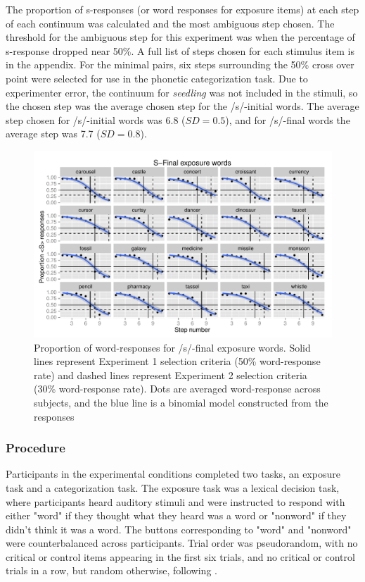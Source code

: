 The proportion of s-responses (or word responses for exposure items) at each step of each continuum was calculated and the most ambiguous step chosen. 
The threshold for the ambiguous step for this experiment was when the percentage of s-response dropped near 50\%. 
A full list of steps chosen for each stimulus item is in the appendix.  For the minimal pairs, six steps surrounding the 50\% cross over point were selected for use in the phonetic categorization task.  
Due to experimenter error, the continuum for \emph{seedling} was not included in the stimuli, so the chosen step was the average chosen step for the /s/-initial words.  
The average step chosen for /s/-initial words was 6.8 ($SD = 0.5$), and for /s/-final words the average step was 7.7 ($SD = 0.8$).

\begin{figure}
\includegraphics[width=\textwidth]{sfinalpretest.pdf}
\caption{Proportion of word-responses for /s/-final exposure words. Solid lines represent Experiment 1 selection criteria (50\% word-response rate) and dashed lines represent Experiment 2 selection criteria (30\% word-response rate).  Dots are averaged word-response across subjects, and the blue line is a binomial model constructed from the responses}
\end{figure}

\subsubsection{Procedure}

Participants in the experimental conditions completed two tasks, an exposure task and a categorization task.  
The exposure task was a lexical decision task, where participants heard auditory stimuli and were instructed to respond with either "word" if they thought what they heard was a word or "nonword" if they didn't think it was a word.  
The buttons corresponding to "word" and "nonword" were counterbalanced across participants. Trial order was pseudorandom, with no critical or control items appearing in the first six trials, and no critical or control trials in a row, but random otherwise, following \citet{Reinisch2013}.

